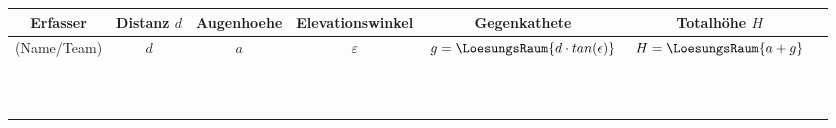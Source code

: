 


\renewcommand{\metaHeaderLine}{Arbeitsblatt}
\renewcommand{\arbeitsblattTitel}{Höhenmessung}

\arbeitsblattHeader{}



\begin{center}
\end{center}

\newcommand{\noteSpace}{\noTRAINER{\rule{0pt}{6.5ex}}}

\begin{tabular}{|c|c|c|c|c|c|c|}
\hline
Erfasser & Distanz $d$ & Augenhoehe & Elevationswinkel & Gegenkathete & Totalhöhe $H$ \\
\hline
(Name/Team) & $d$ & $a$ & $\varepsilon$ &  $g=\LoesungsRaum{d\cdot tan(\epsilon)}$ & $H=\LoesungsRaum{a + g}$ \\
\hline
\noteSpace{}&&&&&\\
\hline
\noteSpace{}&&&&&\\
\hline
\noteSpace{}&&&&&\\
\hline
\noteSpace{}&&&&&\\
\hline
\noteSpace{}&&&&&\\
\hline
\noteSpace{}&&&&&\\
\hline
\noteSpace{}&&&&&\\
\hline
\noteSpace{}&&&&&\\
\hline
\noteSpace{}&&&&&\\
\hline
\noteSpace{}&&&&&\\
\hline
\noteSpace{}&&&&&\\
\hline
\end{tabular}


